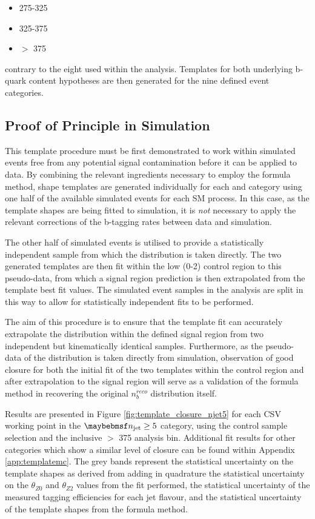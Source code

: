 \begin{itemize}
\item 275-325 \GeV
\item 325-375 \GeV
\item $>$ 375 \GeV
\end{itemize}

contrary to the eight used within the \alphat analysis. Templates for both underlying b-quark content hypotheses are then generated for the nine defined event categories.

\subsection{Proof of Principle in Simulation}
\label{subsec:templateclosuretest}

This template procedure must be first demonstrated to work within simulated events free from any potential signal contamination before it can be applied to data. By combining the relevant ingredients necessary to employ the formula method, \nbreco shape templates are generated individually for each \njet and \theht category using one half of the available simulated events for each \ac{SM} process. In this case, as the template shapes are being fitted to simulation, it is \emph{not} necessary to apply the relevant corrections of the b-tagging rates between data and simulation. 

The other half of simulated events is utilised to provide a statistically independent sample from which the \nbreco distribution is taken directly. The two generated templates are then fit within the low \nbreco (0-2) control region to this pseudo-data, from which a signal region prediction is then extrapolated from the template best fit values.  The simulated event samples in the analysis are split in this way to allow for statistically independent fits to be performed. 

The aim of this procedure is to ensure that the template fit can accurately extrapolate the \nbreco distribution within the defined signal region from two independent but kinematically identical samples. Furthermore, as the pseudo-data of the \nbreco distribution is taken directly from simulation, observation of good closure for both the initial fit of the two templates within the control region and after extrapolation to the signal region will serve as a validation of the formula method in recovering the original $n_{b}^{reco}$ distribution itself. 

Results are presented in Figure \ref{fig:template_closure_njet5} for each \ac{CSV} working point in the $\njet \geq 5$ category, using the \mupjets control sample selection and the inclusive \theht$>$ 375 \GeV analysis bin. Additional fit results for other \njet categories which show a similar level of closure can be found within Appendix \ref{app:templatemc}.  The grey bands represent the statistical uncertainty on the template shapes as derived from adding in quadrature the statistical uncertainty on the $\theta_{Z0}$ and $\theta_{Z2}$ values from the fit performed, the statistical uncertainty of the measured tagging efficiencies for each jet flavour, and the statistical uncertainty of the template shapes from the formula method.

